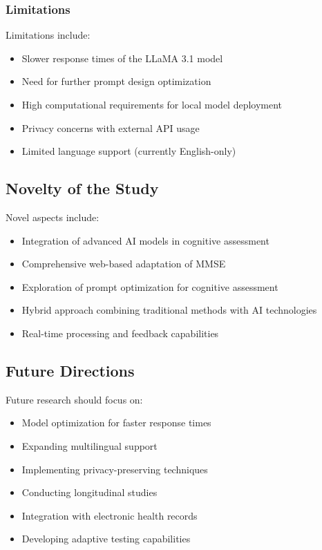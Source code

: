 \subsubsection{Limitations}
Limitations include:
\begin{itemize}
    \item Slower response times of the LLaMA 3.1 model
    \item Need for further prompt design optimization
    \item High computational requirements for local model deployment
    \item Privacy concerns with external API usage
    \item Limited language support (currently English-only)
\end{itemize}

\subsection{Novelty of the Study}
Novel aspects include:
\begin{itemize}
    \item Integration of advanced AI models in cognitive assessment
    \item Comprehensive web-based adaptation of MMSE
    \item Exploration of prompt optimization for cognitive assessment
    \item Hybrid approach combining traditional methods with AI technologies
    \item Real-time processing and feedback capabilities
\end{itemize}

\subsection{Future Directions}
Future research should focus on:
\begin{itemize}
    \item Model optimization for faster response times
    \item Expanding multilingual support
    \item Implementing privacy-preserving techniques
    \item Conducting longitudinal studies
    \item Integration with electronic health records
    \item Developing adaptive testing capabilities
\end{itemize}